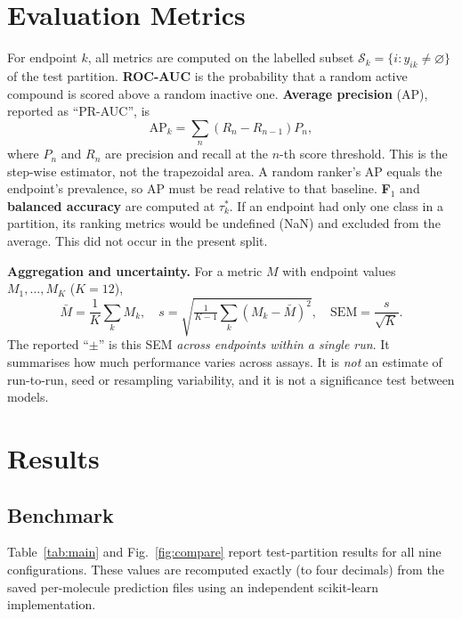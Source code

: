 \documentclass[conference]{IEEEtran}
\begin{document}
\section{Evaluation Metrics}
For endpoint $k$, all metrics are computed on the labelled subset $\mathcal{S}_k=\{i: y_{ik}\neq\varnothing\}$ of the test partition. \textbf{ROC-AUC} is the probability that a random active compound is scored above a random inactive one. \textbf{Average precision} (AP), reported as ``PR-AUC'', is
\begin{equation}
\mathrm{AP}_k=\sum_{n}(R_n-R_{n-1})P_n,
\end{equation}
where $P_n$ and $R_n$ are precision and recall at the $n$-th score threshold. This is the step-wise estimator, not the trapezoidal area. A random ranker's AP equals the endpoint's prevalence, so AP must be read relative to that baseline. \textbf{F$_1$} and \textbf{balanced accuracy} are computed at $\tau_k^{*}$. If an endpoint had only one class in a partition, its ranking metrics would be undefined (NaN) and excluded from the average. This did not occur in the present split.

\textbf{Aggregation and uncertainty.} For a metric $M$ with endpoint values $M_1,\ldots,M_K$ ($K=12$),
\begin{equation}
\bar M=\frac1K\sum_{k}M_k,\quad s=\sqrt{\tfrac{1}{K-1}\sum_k(M_k-\bar M)^2},\quad \mathrm{SEM}=\frac{s}{\sqrt K}.
\end{equation}
The reported ``$\pm$'' is this SEM \emph{across endpoints within a single run}. It summarises how much performance varies across assays. It is \emph{not} an estimate of run-to-run, seed or resampling variability, and it is not a significance test between models.

\section{Results}
\subsection{Benchmark}
Table~\ref{tab:main} and Fig.~\ref{fig:compare} report test-partition results for all nine configurations. These values are recomputed exactly (to four decimals) from the saved per-molecule prediction files using an independent scikit-learn implementation.
\end{document}

